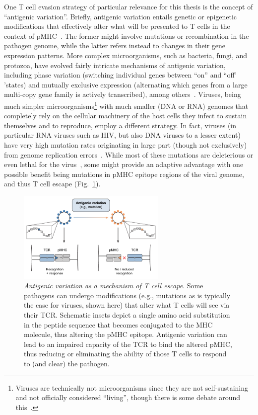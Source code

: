 One T cell evasion strategy of particular relevance for this thesis is the concept of ``antigenic variation''. Briefly, antigenic variation entails genetic or epigenetic modifications that effectively alter what will be presented to T cells in the context of pMHC~\cite{deitsch2009common}. The former might involve mutations or recombination in the pathogen genome, while the latter refers instead to changes in their gene expression patterns. More complex microorganisms, such as bacteria, fungi, and protozoa, have evolved fairly intricate mechanisms of antigenic variation, including phase variation (switching individual genes between ``on'' and ``off' 'states) and mutually exclusive expression (alternating which genes from a large multi-copy gene family is actively transcribed), among others~\cite{van2004phase,deitsch2009common,florini2022shared}. Viruses, being much simpler microorganisms\footnote{Viruses are technically not microorganisms since they are not self-sustaining and not officially considered ``living'', though there is some debate around this~\cite{brown2016viruses}.} with much smaller (DNA or RNA) genomes that completely rely on the cellular machinery of the host cells they infect to sustain themselves and to reproduce, employ a different strategy. In fact, viruses (in particular RNA viruses such as HIV, but also DNA viruses to a lesser extent) have very high mutation rates originating in large part (though not exclusively) from genome replication errors~\cite{sanjuan2016mechanisms}. While most of these mutations are deleterious or even lethal for the virus~\cite{domingo2009fitness,wylie2011biophysical}, some might provide an adaptive advantage with one possible benefit being mutations in pMHC epitope regions of the viral genome, and thus T cell escape (Fig.~\ref{fig:intro_antigenicVariation}).

\begin{figure}
    \centering
    \includegraphics[width=0.64\textwidth]{Figures/intro/fig8_antigenicVariation.pdf}
    \caption[Antigenic variation as a mechanism of T cell escape]{\textit{Antigenic variation as a mechanism of T cell escape}. %
    Some pathogens can undergo modifications (e.g., mutations as is typically the case for viruses, shown here) that alter what T cells will see via their TCR. Schematic insets depict a single amino acid substitution in the peptide sequence that becomes conjugated to the MHC molecule, thus altering the pMHC epitope. Antigenic variation can lead to an impaired capacity of the TCR to bind the altered pMHC, thus reducing or eliminating the ability of those T cells to respond to (and clear) the pathogen.}
    \label{fig:intro_antigenicVariation}
\end{figure}

